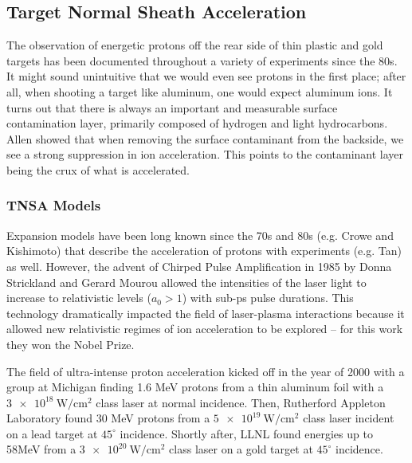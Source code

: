 \subsection{Target Normal Sheath Acceleration}
The observation of energetic protons off the rear side of thin plastic and gold targets has been documented throughout a variety of experiments since the 80s\cite{Tan_1984_PoF}. It might sound unintuitive that we would even see protons in the first place; after all, when shooting a target like aluminum, one would expect aluminum ions. It turns out that there is always an important and measurable surface contamination layer, primarily composed of hydrogen and light hydrocarbons\cite{Gitomer_1986_PoF}. Allen \cite{Allen_2004_PRL} showed that when removing the surface contaminant from the backside, we see a strong suppression in ion acceleration. This points to the contaminant layer being the crux of what is accelerated.

\subsubsection{TNSA Models}

Expansion models have been long known since the 70s and 80s (e.g. Crowe\cite{Crow_1975_JPP} and Kishimoto\cite{Kishimoto_1983_PoF}) that describe the acceleration of protons with experiments (e.g. Tan\cite{Tan_1984_PoF}) as well. However, the advent of Chirped Pulse Amplification\cite{Strickland_1985_Optics} in 1985 by Donna Strickland and Gerard Mourou allowed the intensities of the laser light to increase to relativistic levels ($a_0 > 1$) with sub-ps pulse durations. This technology dramatically impacted the field of laser-plasma interactions because it allowed new relativistic regimes of ion acceleration to be explored -- for this work they won the Nobel Prize\cite{Nobel_2018}. 

The field of ultra-intense proton acceleration kicked off in the year of 2000 with a group at Michigan\cite{Maksimchuk_2000_PRL} finding 1.6 MeV protons from a thin aluminum foil with a $\SI{3e18}{\watt \per \centi \meter \squared}$ class laser at normal incidence. Then, Rutherford Appleton Laboratory found 30 MeV protons\cite{Clark_2000_PRL} from a $\SI{5e19}{\watt \per \centi \meter \squared}$ class laser incident on a lead target at $45^\circ$ incidence. Shortly after, LLNL found energies up to 58MeV\cite{Snavely_2000_PRL} from a $\SI{3e20}{\watt \per \centi \meter \squared}$ class laser on a gold target at $45^\circ$ incidence.


